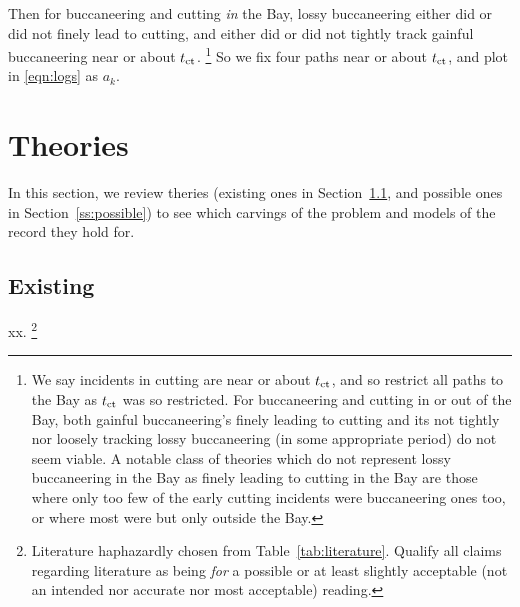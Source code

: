 		Then for buccaneering and cutting \emph{in} the Bay, lossy buccaneering either did or did not finely lead to cutting, and either did or did not tightly track gainful buccaneering near or about \(t_{\operatorname{ct}}\).%
		\footnote{We say  incidents in  cutting are near or about \(t_{\operatorname{ct}}\), and so restrict all paths to the Bay as \(t_{\operatorname{ct}}\) was so restricted. For buccaneering and cutting in or out of the Bay, both gainful buccaneering's finely leading to cutting and its not tightly nor loosely tracking lossy buccaneering (in some appropriate period) do not seem viable. A notable class of theories which do not represent lossy buccaneering in the Bay as finely leading to cutting in the Bay are those where only too few of the early cutting incidents were buccaneering ones too, or where most were but only outside the Bay.} %
		So we fix four paths near or about \(t_{\operatorname{ct}}\), and plot in \ref{eqn:logs} as \(a_k\). %
%
%
%
\section{Theories}
\label{s:theories}
	In this section, we review theries (existing ones in Section~\ref{ss:existing}, and possible ones in Section~\ref{ss:possible}) to see which carvings of the problem and models of the record they hold for.
	\subsection{Existing}
	\label{ss:existing}
		xx.%
		\footnote{Literature haphazardly chosen from Table~\ref{tab:literature}. Qualify all claims regarding literature as being \emph{for} a possible or at least slightly acceptable (not an intended nor accurate nor most acceptable) reading.}
		
